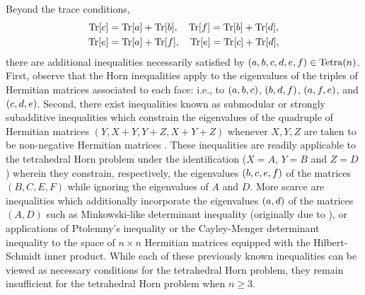 \documentclass[notitlepage, 11pt, letterpaper]{amsart}
\begin{document}
Beyond the trace conditions,
\begin{align}
    \label{eq:tet_trace_cond}
    \begin{split}
        \operatorname{Tr}[c] &= \operatorname{Tr}[a] + \operatorname{Tr}[b], \quad
        \operatorname{Tr}[f] = \operatorname{Tr}[b] + \operatorname{Tr}[d], \\
        \operatorname{Tr}[e] &= \operatorname{Tr}[a] + \operatorname{Tr}[f], \quad
        \operatorname{Tr}[e] = \operatorname{Tr}[c] + \operatorname{Tr}[d],
    \end{split}
\end{align}
there are additional inequalities necessarily satisfied by $(a,b,c,d,e,f) \in \operatorname{Tetra}(n)$.
First, observe that the Horn inequalities \cite{horn1962eigenvalues} apply to the eigenvalues of the triples of Hermitian matrices associated to each face: i.e., to $(a,b,c)$, $(b,d,f)$, $(a,f,e)$, and $(c,d,e)$.
Second, there exist inequalities known as submodular or strongly subadditive inequalities which constrain the eigenvalues of the quadruple of Hermitian matrices $(Y,X+Y,Y+Z,X+Y+Z)$ whenever $X,Y,Z$ are taken to be non-negative Hermitian matrices \cite{berndt2015hlawka, tie2011rearrangement, sagnol2013approximation, bouhtou2008optimization, friedland2013submodular, lewin2014family, sra2017determinantoverflow}.
These inequalities are readily applicable to the tetrahedral Horn problem under the identification ($X=A$, $Y=B$ and $Z=D$) wherein they constrain, respectively, the eigenvalues $(b,c,e,f)$ of the matrices $(B,C,E,F)$ while ignoring the eigenvalues of $A$ and $D$.
More scarce are inequalities which additionally incorporate the eigenvalues $(a,d)$ of the matrices $(A,D)$ such as Minkowski-like determinant inequality \cite[Section 6.2]{niculescu2023functions} (originally due to \citeauthor{courtade2016strengthening} \cite{courtade2016strengthening, sra2016reverseoverflow}), or applications of Ptolemny's inequality \cite{schoenberg1952remark} or the Cayley-Menger determinant inequality \cite[Equation 5.2]{sitharam2018handbook} to the space of $n\times n$ Hermitian matrices equipped with the Hilbert-Schmidt inner product.
While each of these previously known inequalities can be viewed as necessary conditions for the tetrahedral Horn problem, they remain insufficient for the tetrahedral Horn problem when $n\geq 3$.
\end{document}
